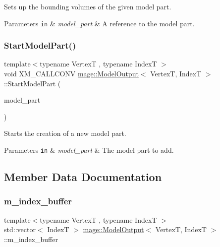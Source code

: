 Sets up the bounding volumes of the given model part.


\begin{DoxyParams}[1]{Parameters}
\mbox{\tt in}  & {\em model\+\_\+part} & A reference to the model part. \\
\hline
\end{DoxyParams}
\hypertarget{structmage_1_1_model_output_a204f16513741ebfacb7a287969629956}{}\label{structmage_1_1_model_output_a204f16513741ebfacb7a287969629956} 
\subsubsection{\texorpdfstring{Start\+Model\+Part()}{StartModelPart()}}
{\footnotesize\ttfamily template$<$typename VertexT , typename IndexT $>$ \\
void X\+M\+\_\+\+C\+A\+L\+L\+C\+O\+NV \hyperlink{structmage_1_1_model_output}{mage\+::\+Model\+Output}$<$ VertexT, IndexT $>$\+::Start\+Model\+Part (\begin{DoxyParamCaption}\item[{\hyperlink{structmage_1_1_model_part}{Model\+Part}}]{model\+\_\+part }\end{DoxyParamCaption})}

Starts the creation of a new model part.


\begin{DoxyParams}[1]{Parameters}
\mbox{\tt in}  & {\em model\+\_\+part} & The model part to add. \\
\hline
\end{DoxyParams}


\subsection{Member Data Documentation}
\hypertarget{structmage_1_1_model_output_accf4483b85b26525e180e6ffd3678fc6}{}\label{structmage_1_1_model_output_accf4483b85b26525e180e6ffd3678fc6} 
\subsubsection{\texorpdfstring{m\+\_\+index\+\_\+buffer}{m\_index\_buffer}}
{\footnotesize\ttfamily template$<$typename VertexT , typename IndexT $>$ \\
std\+::vector$<$ IndexT $>$ \hyperlink{structmage_1_1_model_output}{mage\+::\+Model\+Output}$<$ VertexT, IndexT $>$\+::m\+\_\+index\+\_\+buffer}

